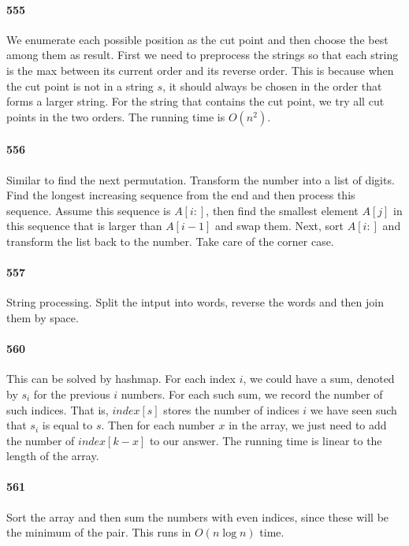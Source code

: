 \documentclass[11pt]{article}
\begin{document}
\begin{itemize}
\paragraph{555}
We enumerate each possible position as the cut point and then choose the best among them as result. 
First we need to preprocess the strings so that each string is the max between its current order and its reverse order.
This is because when the cut point is not in a string $s$, it should always be chosen in the order that forms a larger string.
For the string that contains the cut point, we try all cut points in the two orders. The running time is $O(n^2)$. 

\paragraph{556}
Similar to find the next permutation. Transform the number into a list of digits. 
Find the longest increasing sequence from the end and then process this sequence.
Assume this sequence is $A[i:]$, then find the smallest element $A[j]$ in this sequence that is larger than $A[i-1]$ and swap
them. Next, sort $A[i:]$ and transform the list back to the number. Take care of the corner case.

\paragraph{557}
String processing. Split the intput into words, reverse the words and then join them by space.

\paragraph{560}
This can be solved by hashmap. For each index $i$, we could have a sum, denoted by $s_i$ for the previous $i$ numbers. 
For each such sum, we record the number of such indices. 
That is, $index[s]$ stores the number of indices $i$ we have seen such that $s_i$ is equal to $s$.
Then for each number $x$ in the array, we just need to add the number of $index[k-x]$ to our answer.
The running time is linear to the length of the array.




\paragraph{561}
Sort the array and then sum the numbers with even indices, since these will be the minimum of the pair. 
This runs in $O(n \log n)$ time.


\end{itemize}
\end{document}
